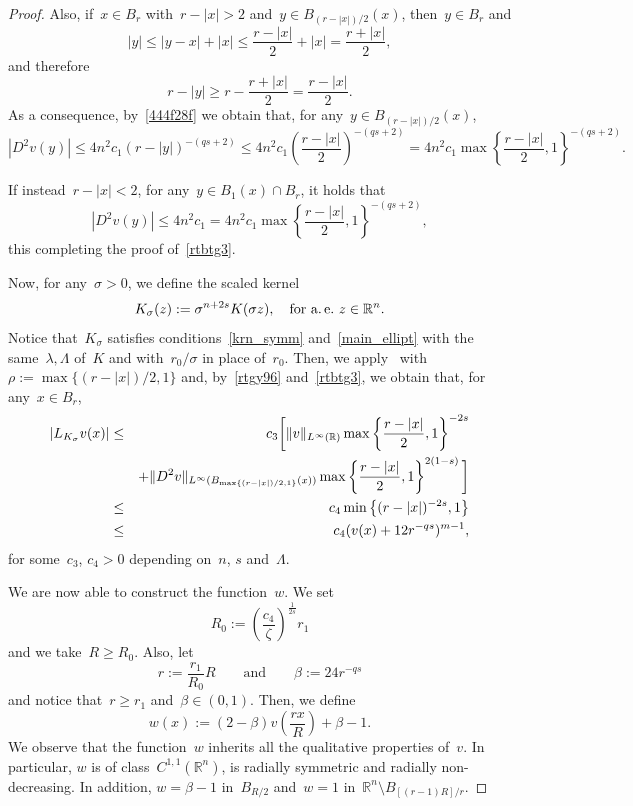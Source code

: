 \documentclass[10pt,a4paper]{amsart}
\numberwithin{equation}{section}
\newcommand{\R}{\mathbb{R}}
\begin{document}
\begin{proof}
Also, if~$x \in B_r$ with~$r-|x |>2$ and~$y \in B_{(r-| x |)/2}(x)$, then~$y \in B_r$ and
$$
|y | \leq |y -x | + |x | \leq \frac{r-|x |}{2}+|x | = \frac{r+|x |}{2},
$$
and therefore
$$
r-|y | \geq r - \frac{r + |x |}{2} = \frac{r-|x |}{2}.
$$
As a consequence, by~\eqref{444f28f} we obtain that, for any~$y  \in B_{(r-|x |)/2}(x)$,
$$
|D^2 v(y)| \leq 4n^2 c_1 (r-|y |)^{-(qs+2)} \leq 4n^2 c_1  \left(\frac{r -|x |}{2}\right)^{-(qs+2)} = 4 n^2 c_1  \max \left\{ \frac{r -|x |}{2},1\right\}^{-(qs+2)}.
$$

If instead~$r-|x |<2$, for any~$y \in B_1(x) \cap B_r$, it holds that
$$
|D^2 v(y)| \leq 4n^2 c_1=4n^2 c_1 \max\left\{\frac{r-|x |}{2},1 \right\}^{-(qs+2)},
$$
this completing the proof of~\eqref{rtbtg3}.

Now, for any~$\sigma>0$, we define the scaled kernel
$$
K_{\sigma}(z):= \sigma^{n+2s} K(\sigma z), \quad\mbox{for a.~\!e.} \ z \in \R^n.
$$
Notice that~$K_{\sigma}$ satisfies conditions~\eqref{krn_symm} and~\eqref{main_ellipt} with the same~$\lambda,\Lambda$ of~$K$ and with~$r_0/\sigma$ in place of~$r_0$. Then, we apply~\cite[Lemma~6.9]{cozzibarrier} with~$\rho := \max\{(r-|x |)/2,1\}$ and, by~\eqref{rtgy96} and~\eqref{rtbtg3}, we obtain that, for any~$x \in B_r$,
\begin{eqnarray}\label{peccxce}
| {L}_{K_{\sigma}}v (x) | & \leq & c_3 \bigg[ \Vert v \Vert_{L^{\infty}(\R)} \max \left\{\frac{r-|x |}{2},1 \right\}^{-2s}\notag\\
&& + \Vert D^2v\Vert_{L^{\infty}(B_{\max\{(r-|x |)/2,1\}}(x))} \max\left\{\frac{r-| x|}{2},1 \right\}^{2(1-s)}\bigg] \notag \\
&\leq & c_4  \min\left\{(r-|x |)^{-2s},1 \right\} \notag\\
&\leq & c_4 (v(x)+12r^{-qs})^{m-1},
\end{eqnarray}
for some~$c_3$, $c_4>0$ depending on~$n$, $s$ and~$\Lambda$.

We are now able to construct the function~$w$. We set
\begin{equation}\label{mnbvcxasdfghj098765werty}
R_0:= \left( \frac{c_4}{\zeta}\right)^{\frac{1}{2s}} r_1
\end{equation}
and we take~$R\geq R_0$. Also, let
\begin{equation}\label{mnbvcxasdfghj098765werty2}
r:= \frac{r_1}{R_0}R \qquad\mbox{and}\qquad \beta:= 24 r^{-qs}
\end{equation}
and notice that~$r\geq r_1$ and~$\beta \in (0,1)$. Then, we define
\begin{equation}\label{mnbvcxasdfghj098765werty23}
w(x):= (2-\beta) v\left(\frac{rx}{R}\right)+\beta -1.
\end{equation}
We observe that the function~$w$ inherits all the qualitative properties of~$v$. In particular, $w$ is of class~$C^{1,1}(\R^n)$, is radially symmetric and radially non-decreasing. In addition, $w= \beta-1$ in~$B_{R/2}$ and~$w=1$ in~$\R^n \setminus B_{[(r-1)R]/r}$. 


\end{proof}
\end{document}
